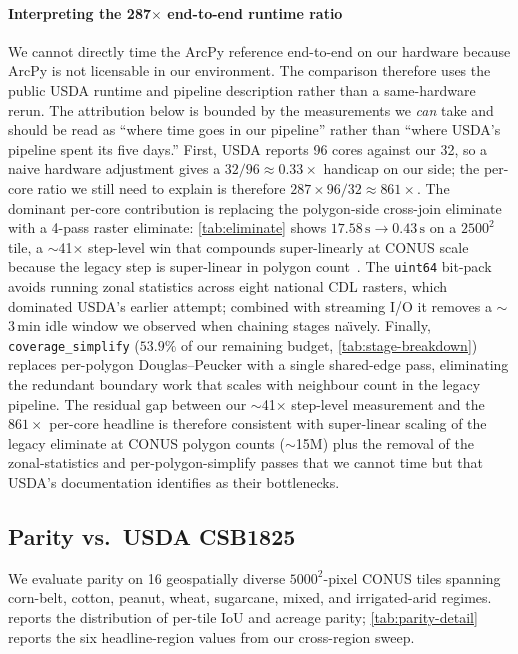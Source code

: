 \documentclass[preprint,12pt]{elsarticle}
\begin{document}
\paragraph{Interpreting the 287$\times$ end-to-end runtime ratio}
We cannot directly time the ArcPy reference end-to-end on our hardware
because ArcPy is not licensable in our environment. The comparison
therefore uses the public USDA runtime and pipeline description rather
than a same-hardware rerun. The attribution below is bounded by the
measurements we \emph{can} take and should be read as ``where time goes
in our pipeline'' rather than ``where USDA's pipeline spent its five
days.'' First, USDA reports 96 cores against our 32, so a naive hardware
adjustment gives a $32/96 \approx 0.33\times$ handicap on our side; the
per-core ratio we still need to explain is therefore $287 \times 96/32
\approx 861\times$. The dominant per-core contribution is replacing the
polygon-side cross-join eliminate with a 4-pass raster eliminate:
\cref{tab:eliminate} shows
$17.58\,\text{s}\to 0.43\,\text{s}$ on a $2500^2$ tile, a $\sim$41$\times$
step-level win that compounds super-linearly at CONUS scale because the
legacy step is super-linear in polygon count~\cite{hunt2024csb}. The
\texttt{uint64} bit-pack avoids running zonal statistics across eight
national CDL rasters, which dominated USDA's earlier attempt; combined
with streaming I/O it removes a $\sim$3\,min idle window we observed
when chaining stages na\"{\i}vely. Finally, \texttt{coverage\_simplify}
($53.9\%$ of our remaining budget, \cref{tab:stage-breakdown}) replaces
per-polygon Douglas--Peucker with a single shared-edge pass, eliminating
the redundant boundary work that scales with neighbour count in the
legacy pipeline. The residual gap between our $\sim$41$\times$ step-level
measurement and the $861\times$ per-core headline is therefore
consistent with super-linear scaling of the legacy eliminate at CONUS
polygon counts ($\sim$15M) plus the removal of the zonal-statistics and
per-polygon-simplify passes that we cannot time but that USDA's
documentation identifies as their bottlenecks.

\subsection{Parity vs.\ USDA CSB1825}
\label{sec:results-parity}

We evaluate parity on 16 geospatially diverse $5000^2$-pixel CONUS
tiles spanning corn-belt, cotton, peanut, wheat, sugarcane, mixed,
and irrigated-arid regimes.  reports the
distribution of per-tile IoU and acreage parity;
\cref{tab:parity-detail} reports the six headline-region values from
our cross-region sweep.
\end{document}
